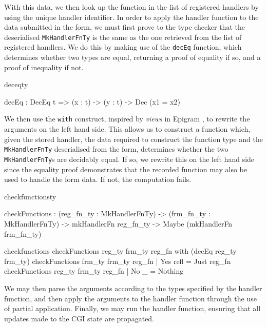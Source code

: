 With this data, we then look up the function in the list of registered
handlers by using the unique handler identifier. In order to apply
the handler function to the data submitted in the form, we must first prove to
the type checker that the deserialised \texttt{MkHandlerFnTy} is the same as
the one retrieved from the list of registered handlers. We do this by making
use of the \texttt{decEq} function, which determines whether two types are
equal, returning a proof of equality if so, and a proof of inequality if not.

\begin{SaveVerbatim}{deceqty}

decEq : DecEq t => (x : t) -> (y : t) -> Dec (x1 = x2)

\end{SaveVerbatim}

We then use the \texttt{with} construct, inspired by
\textit{views} in Epigram \cite{mcbride.mckinna:viewfromleft}, to rewrite the
arguments on the left hand side. This allows us to construct a function which,
given the stored handler, the data required to
construct the function type and the \texttt{MkHandlerFnTy} deserialised from
the form, determines whether the two \texttt{MkHandlerFnTy}s are decidably
equal. If so, we rewrite this on the left hand side since the equality proof
demonstrates that the recorded function may also be used to handle the form
data. If not, the computation fails.

\begin{SaveVerbatim}{checkfunctionsty}

checkFunctions : (reg_fn_ty : MkHandlerFnTy) -> 
                 (frm_fn_ty : MkHandlerFnTy) -> 
                 mkHandlerFn reg_fn_ty -> 
                 Maybe (mkHandlerFn frm_fn_ty)
\end{SaveVerbatim}

\begin{SaveVerbatim}{checkfunctions}
checkFunctions reg_ty frm_ty reg_fn with 
                             (decEq reg_ty frm_ty)
  checkFunctions frm_ty frm_ty reg_fn 
                        | Yes refl = Just reg_fn
  checkFunctions reg_ty frm_ty reg_fn 
                        | No _ = Nothing

\end{SaveVerbatim}



\noindent
We may then parse the arguments according to the types specified by the handler
function, and then apply the arguments to the handler function through the use
of partial application. Finally, we may run the handler function, ensuring that
all updates made to the CGI state are propagated.


